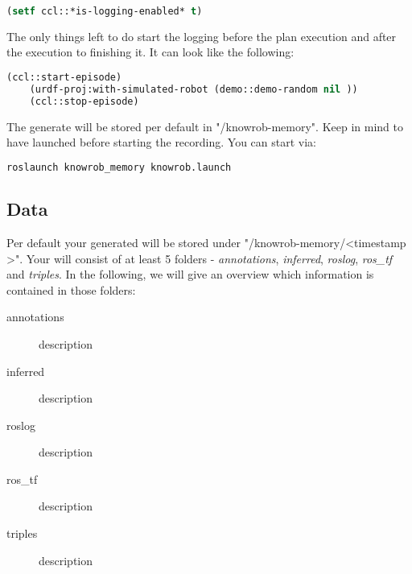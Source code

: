 \begin{lstlisting}[language=lisp, caption=Enabling \neem Logging in a \cram plan]
	(setf ccl::*is-logging-enabled* t)
\end{lstlisting}

The only things left to do start the logging before the plan execution and after the execution to finishing it.
It can look like the following:
\begin{lstlisting}[language=lisp, caption=Steps to Record an Episode for a \cram Plan]
	(ccl::start-episode)
	(urdf-proj:with-simulated-robot (demo::demo-random nil ))
	(ccl::stop-episode)
\end{lstlisting}
	
The generate \neem will be stored per default in "\raisebox{-0.9ex}{\~{}}/knowrob-memory".
Keep in mind to  have \knowrob launched before starting the \neem recording. 
You can start \knowrob via:

\begin{lstlisting}[language=bash, caption=How to Start \knowrob]
	roslaunch knowrob_memory knowrob.launch
\end{lstlisting}

\subsection{Data}
Per default your generated \neem will be stored under "\raisebox{-0.9ex}{\~{}}/knowrob-memory/\textless timestamp \textgreater". 
Your \neem will consist of at least 5 folders - \textit{annotations}, \textit{inferred}, \textit{roslog}, \textit{ros\_tf} and \textit{triples}.
In the following, we will give an overview which information is contained in those folders:

\begin{description}
	\item[annotations] description
	\item[inferred] description
	\item[roslog] description
	\item[ros\_tf] description
	\item[triples] description	
\end{description}


